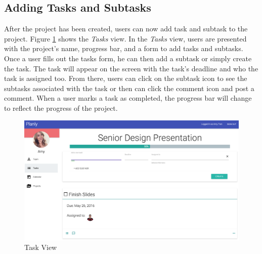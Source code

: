 \subsection{Adding Tasks and Subtasks}
After the project has been created, users can now add task and subtask to the project. Figure \ref{taskview} shows the \emph{Tasks} view. In the \emph{Tasks} view, users are presented with the project's name, progress bar, and a form to add tasks and subtasks. Once a user fills out the tasks form, he can then add a subtask or simply create the task. The task will appear on the screen with the task's deadline and who the task is assigned too. From there, users can click on the subtask icon to see the subtasks associated with the task or then can click the comment icon and post a comment. When a user marks a task as completed, the progress bar will change to reflect the progress of the project. 

\begin{figure}[ht]
\centering
\includegraphics[width=\textwidth]{figure45.png}
\caption{Task View}
\label{taskview}
\end{figure}
\FloatBarrier


